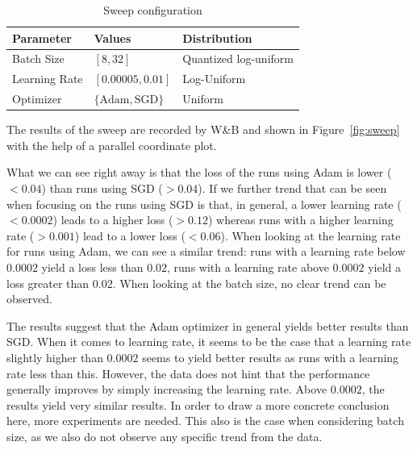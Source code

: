 \begin{table}
    \centering
    \begin{tabular}{l|l|l}
        \textbf{Parameter} & \textbf{Values} & \textbf{Distribution}  \\\hline
        Batch Size & $[8,32]$ & Quantized log-uniform\\
        Learning Rate & $[0.00005, 0.01]$ & Log-Uniform \\
        Optimizer & $\{\text{Adam}, \text{SGD}\}$ & Uniform\\
    \end{tabular}
    \caption{Sweep configuration}
    \label{tab:sweep}
\end{table}

The results of the sweep are recorded by W\&B and shown in Figure~\ref{fig:sweep} with the help of a parallel coordinate plot.

What we can see right away is that the loss of the runs using Adam is lower ($< 0.04$) than runs using SGD ($> 0.04$). If we further trend that can be seen when focusing on the runs using SGD is that, in general, a lower learning rate ($<0.0002$) leads to a higher loss ($>0.12$) whereas runs with a higher learning rate ($> 0.001$) lead to a lower loss ($<0.06$). When looking at the learning rate for runs using Adam, we can see a similar trend: runs with a learning rate below $0.0002$ yield a loss less than $0.02$, runs with a learning rate above $0.0002$ yield a loss greater than $0.02$. When looking at the batch size, no clear trend can be observed.

The results suggest that the Adam optimizer in general yields better results than SGD. When it comes to learning rate, it seems to be the case that a learning rate slightly higher than $0.0002$ seems to yield better results as runs with a learning rate less than this. However, the data does not hint that the performance generally improves by simply increasing the learning rate. Above $0.0002$, the results yield very similar results. In order to draw a more concrete conclusion here, more experiments are needed. This also is the case when considering batch size, as we also do not observe any specific trend from the data.
